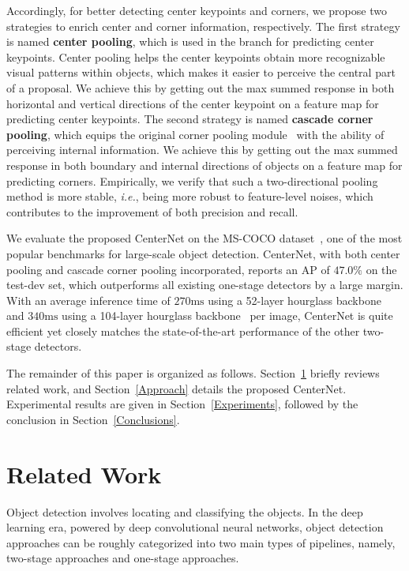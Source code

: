 \documentclass[10pt,twocolumn,letterpaper]{article}
\begin{document}
Accordingly, for better detecting center keypoints and corners, we propose two strategies to enrich center and corner information, respectively.
The first strategy is named {\bf center pooling}, which is used in the branch for predicting center keypoints. Center pooling helps the center keypoints obtain more recognizable visual patterns within objects, which makes it easier to perceive the central part of a proposal. We achieve this by getting out the max summed response in both horizontal and vertical directions of the center keypoint on a feature map for predicting center keypoints. 
The second strategy is named {\bf cascade corner pooling}, which equips the original corner pooling module~\cite{law2018cornernet} with the ability of perceiving internal information. We achieve this by getting out the max summed response in both boundary and internal directions of objects on a feature map for predicting corners. Empirically, we verify that such a two-directional pooling method is more stable, {\em i.e.}, being more robust to feature-level noises, which contributes to the improvement of both precision and recall. 

We evaluate the proposed CenterNet on the MS-COCO dataset~\cite{lin2014microsoft}, one of the most popular benchmarks for large-scale object detection. CenterNet, with both center pooling and cascade corner pooling incorporated, reports an AP of $\mathbf{47.0\%}$ on the test-dev set, which outperforms all existing one-stage detectors by a large margin. With an average inference time of $270\mathrm{ms}$ using a 52-layer hourglass backbone~\cite{newell2016stacked} and $340\mathrm{ms}$ using a 104-layer hourglass backbone~\cite{newell2016stacked} per image, CenterNet is quite efficient yet closely matches the state-of-the-art performance of the other two-stage detectors.

The remainder of this paper is organized as follows. Section~\ref{RelatedWork} briefly reviews related work, and Section~\ref{Approach} details the proposed CenterNet. Experimental results are given in Section~\ref{Experiments}, followed by the conclusion in Section~\ref{Conclusions}.

\section{Related Work}
\label{RelatedWork}

Object detection involves locating and classifying the objects. In the deep learning era, powered by deep convolutional neural networks, object detection approaches can be roughly categorized into two main types of pipelines, namely, two-stage approaches and one-stage approaches.
\end{document}
